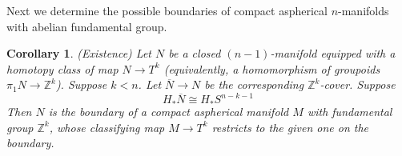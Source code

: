 \documentclass[12pt]{amsart}
\newtheorem{corollary}[theorem]{Corollary}
\theoremstyle{definition}
\newtheorem{remark}[theorem]{Remark}
\newcommand{\Z}{\mathbb Z}
\DeclareMathOperator{\cok}{cok}
\DeclareMathOperator{\inc}{inc}
\DeclareMathOperator{\rank}{rank}
\newcommand{\ol}[1]{{\overline{#1}}}
\newcommand{\wt}[1]{{\widetilde{#1}}}
\begin{document}
% 
% 
% 
% 
% 
% 

Next we determine the possible boundaries of compact aspherical 
$n$-manifolds with abelian fundamental group. 

\begin{corollary} (Existence) \label{existence free abelian} Let $N$ be a closed $(n-1)$-manifold equipped with a homotopy class of map $N \to T^k$ (equivalently, a homomorphism of groupoids $\pi_1N \to \Z^k$).   Suppose $k < n$.   Let $\ol N \to N$ be the corresponding $\Z^k$-cover.    Suppose 
$$
H_*\ol N \cong H_*S^{n-k-1}
$$
Then $N$ is the boundary of a compact aspherical manifold $M$ with fundamental group $\Z^k$, whose classifying map $M \to T^k$ restricts to the given one on the boundary.   
 \end{corollary}
\end{document}
